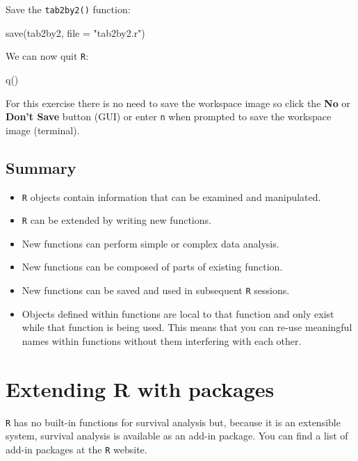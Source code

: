 \documentclass[
  12pt,
]{book}
\newenvironment{Shaded}{\begin{snugshade}}{\end{snugshade}}
\newcommand{\AttributeTok}[1]{\textcolor[rgb]{0.77,0.63,0.00}{#1}}
\newcommand{\FunctionTok}[1]{\textcolor[rgb]{0.00,0.00,0.00}{#1}}
\newcommand{\NormalTok}[1]{#1}
\newcommand{\StringTok}[1]{\textcolor[rgb]{0.31,0.60,0.02}{#1}}
\begin{document}
Save the \texttt{tab2by2()} function:

\begin{Shaded}
\begin{Highlighting}[]
\FunctionTok{save}\NormalTok{(tab2by2, }\AttributeTok{file =} \StringTok{"tab2by2.r"}\NormalTok{)}
\end{Highlighting}
\end{Shaded}

We can now quit \texttt{R}:

\begin{Shaded}
\begin{Highlighting}[]
\FunctionTok{q}\NormalTok{()}
\end{Highlighting}
\end{Shaded}

For this exercise there is no need to save the workspace image so click the \textbf{No} or \textbf{Don't Save} button (GUI) or enter \texttt{n} when prompted to save the workspace image (terminal).

\hypertarget{summary-1}{%
\section{Summary}\label{summary-1}}

\begin{itemize}
\item
  \texttt{R} objects contain information that can be examined and manipulated.
\item
  \texttt{R} can be extended by writing new functions.
\item
  New functions can perform simple or complex data analysis.
\item
  New functions can be composed of parts of existing function.
\item
  New functions can be saved and used in subsequent \texttt{R} sessions.
\item
  Objects defined within functions are local to that function and only exist while that function is being used. This means that you can re-use meaningful names within functions without them interfering with each other.
\end{itemize}

\hypertarget{extend-r}{%
\chapter{Extending R with packages}\label{extend-r}}

\texttt{R} has no built-in functions for survival analysis but, because it is an extensible system, survival analysis is
available as an add-in package. You can find a list of add-in packages at the \texttt{R} website.
\end{document}
